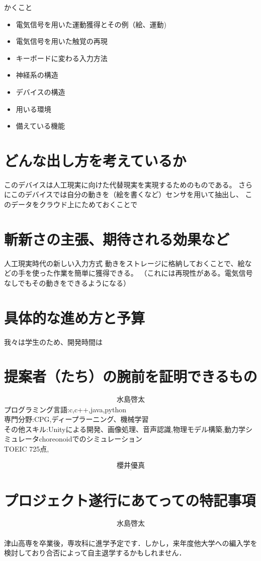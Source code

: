 \documentclass[11pt,onecolumn]{jsarticle}
\begin{document}
かくこと
\begin{itemize}
 \item 電気信号を用いた運動獲得とその例（絵、運動)
 \item 電気信号を用いた触覚の再現
 \item キーボードに変わる入力方法
 \item 神経系の構造
 \item デバイスの構造
 \item 用いる環境
 \item 備えている機能
\end{itemize}

\section{どんな出し方を考えているか}
このデバイスは人工現実に向けた代替現実を実現するためのものである。
さらにこのデバイスでは自分の動きを（絵を書くなど）センサを用いて抽出し、
このデータをクラウド上にためておくことで

\section{斬新さの主張、期待される効果など}
人工現実時代の新しい入力方式
動きをストレージに格納しておくことで、絵などの手を使った作業を簡単に獲得できる。
（これには再現性がある。電気信号なしでもその動きをできるようになる）



\section{具体的な進め方と予算}
我々は学生のため、開発時間は

\section{提案者（たち）の腕前を証明できるもの}
\[
  \underline{水島啓太}
\]
プログラミング言語:c,c++,java,python\\
専門分野:CPG,ディープラーニング、機械学習\\
その他スキル:Unityによる開発、画像処理、音声認識,物理モデル構築,動力学シミュレータchoreonoidでのシミュレーション\\
TOEIC 725点,

\[
  \underline{櫻井優真}
\]



\section{プロジェクト遂行にあてっての特記事項}
\[
  \underline{水島啓太}
\]\\
津山高専を卒業後，専攻科に進学予定です．しかし，来年度他大学への編入学を検討しており合否によって自主退学するかもしれません．
\end{document}
